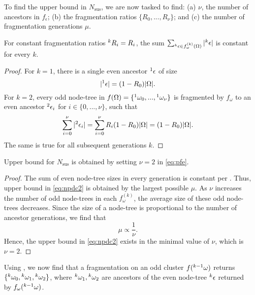 To find the upper bound in $N_{\text{sus}}$, we are now tasked to find: (a) $\nu$, the number of ancestors in $f_\epsilon$; (b) the fragmentation ratios $\{R_0, ..., R_\nu\}$; and (c) the number of fragmentation generations $\mu$. 

\begin{lemma}\label{lem:evenconstant}
  For constant fragmentation ratios ${}^{k}R_i = R_i$, the sum $\sum_{ {}^{k}\epsilon \in f_\omega^{(k)}(\Omega) }{ \lvert{}^{k}\epsilon\rvert}$ is constant for every $k$. 
\end{lemma}
\begin{proof}
  For $k=1$, there is a single even ancestor ${}^{1}\epsilon$ of size 
  \begin{equation*}
    \lvert{}^{1}\epsilon\rvert = (1 - R_0)\lvert\Omega\rvert.
  \end{equation*}
  For $k=2$, every odd node-tree in $f(\Omega)=\{{}^{1}\omega_0,...,{}^{1}\omega_\nu\}$ is fragmented by $f_\omega$ to an even ancestor ${}^{2}\epsilon_i$ for $i \in \{0,...,\nu \}$, such that 
  \begin{equation*}
    \sum_{i=0}^{\nu}{\lvert{}^{2}\epsilon_i\rvert}  = \sum_{i=0}^{\nu}{R_i(1 - R_0)\lvert\Omega\rvert}= (1 - R_0)\lvert\Omega\rvert.
  \end{equation*}
  The same is true for all subsequent generations $k$. 
\end{proof}

\begin{theorem}\label{the:fragnumber}
  Upper bound for $N_{\text{sus}}$ is obtained by setting $\nu=2$ in \eqref{eq:pfe}. 
\end{theorem}
\begin{proof}
  The sum of even node-tree sizes in every generation is constant per . Thus, upper bound in \eqref{eq:npdc2} is obtained by the largest possible $\mu$. As $\nu$ increases the number of odd node-trees in each $f^{(k)}_\omega$, the average size of these odd node-trees decreases. Since the size of a node-tree is proportional to the number of ancestor generations, we find that 
  \begin{equation*}
    \mu \propto \frac{1}{\nu}. 
  \end{equation*}
  Hence, the upper bound in \eqref{eq:npdc2} exists in the minimal value of $\nu$, which is $\nu = 2$.
\end{proof}

Using , we now find that a fragmentation on an odd cluster $f({}^{k-1}\omega)$ returns $\{{}^{k}\omega_0, {}^{k}\omega_1, {}^{k}\omega_2\}$, where ${}^{k}\omega_1, {}^{k}\omega_2$ are ancestors of the even node-tree ${}^{k}\epsilon$ returned by $f_\omega({}^{k-1}\omega)$. 

